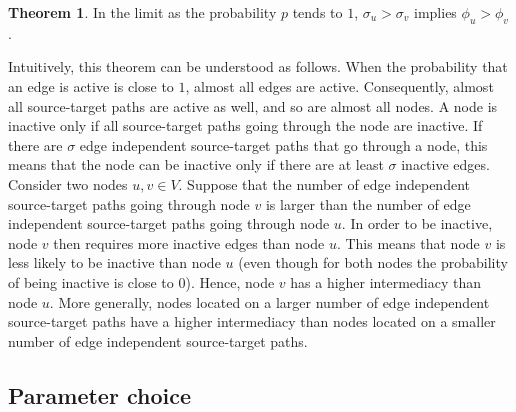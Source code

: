 \documentclass[9pt,twocolumn,twoside]{pnas-alt} %
\theoremstyle{definition}
\newtheorem{theorem}{Theorem}
\begin{document}
\begin{theorem}
    In the limit as the probability $p$ tends to $1$, $\sigma_u > \sigma_v$ implies $\phi_u > \phi_v$.
    \label{the:p1}
\end{theorem}

Intuitively, this theorem can be understood as follows. When the probability that an edge is active is close to $1$, almost all edges are active. Consequently, almost all source-target paths are active as well, and so are almost all nodes. A node is inactive only if all source-target paths going through the node are inactive. If there are $\sigma$ edge independent source-target paths that go through a node, this means that the node can be inactive only if there are at least $\sigma$ inactive edges. Consider two nodes $u, v \in V$. Suppose that the number of edge independent source-target paths going through node $v$ is larger than the number of edge independent source-target paths going through node $u$. In order to be inactive, node $v$ then requires more inactive edges than node $u$. This means that node $v$ is less likely to be inactive than node $u$ (even though for both nodes the probability of being inactive is close to $0$). Hence, node $v$ has a higher intermediacy than node $u$. More generally, nodes located on a larger number of edge independent source-target paths have a higher intermediacy than nodes located on a smaller number of edge independent source-target paths.

%
%

\subsection*{\label{sec:param}Parameter choice}
\end{document}
